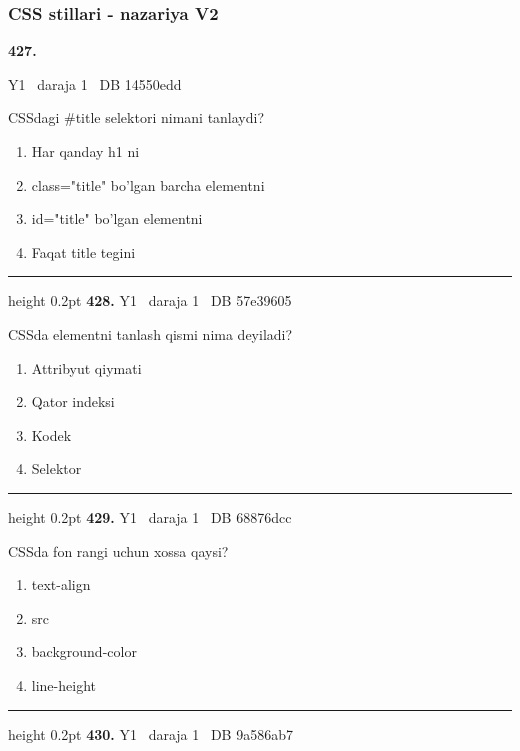 \documentclass[10pt,a4paper,oneside]{article}
\begin{document}
\subsubsection{CSS stillari - nazariya V2}
\hypertarget{q427}{\textbf{\color{ink}427.}}  {\color{muted}\scriptsize Y1 \textbullet\ daraja 1 \textbullet\ DB 14550edd}
\par
CSSdagi \#title selektori nimani tanlaydi?
\begin{enumerate}[label=\Alph*),leftmargin=9mm]
\item Har qanday h1 ni
\item class="title" bo'lgan barcha elementni
\item id="title" bo'lgan elementni
\item Faqat title tegini
\end{enumerate}
\vspace{2mm}\hrule height 0.2pt \vspace{4mm}
\hypertarget{q428}{\textbf{\color{ink}428.}}  {\color{muted}\scriptsize Y1 \textbullet\ daraja 1 \textbullet\ DB 57e39605}
\par
CSSda elementni tanlash qismi nima deyiladi?
\begin{enumerate}[label=\Alph*),leftmargin=9mm]
\item Attribyut qiymati
\item Qator indeksi
\item Kodek
\item Selektor
\end{enumerate}
\vspace{2mm}\hrule height 0.2pt \vspace{4mm}
\hypertarget{q429}{\textbf{\color{ink}429.}}  {\color{muted}\scriptsize Y1 \textbullet\ daraja 1 \textbullet\ DB 68876dcc}
\par
CSSda fon rangi uchun xossa qaysi?
\begin{enumerate}[label=\Alph*),leftmargin=9mm]
\item text-align
\item src
\item background-color
\item line-height
\end{enumerate}
\vspace{2mm}\hrule height 0.2pt \vspace{4mm}
\hypertarget{q430}{\textbf{\color{ink}430.}}  {\color{muted}\scriptsize Y1 \textbullet\ daraja 1 \textbullet\ DB 9a586ab7}
\end{document}
